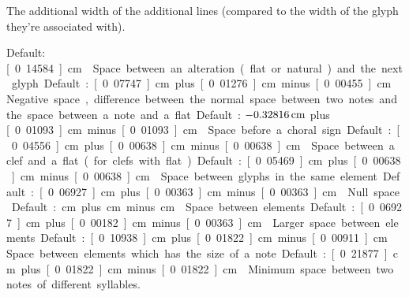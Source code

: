 The additional width of the additional lines (compared to the width of the glyph they're associated with).  

Default: \unit[0.14584]{cm}

Space between an alteration (flat or natural) and the next glyph. 

Default: \unit[0.07747]{cm} plus \unit[0.01276]{cm} minus \unit[0.00455]{cm}

Negative space, difference between the normal space between two notes and the space between a note and a flat.  

Default: $\unit[-0.32816]{cm}$ plus \unit[0.01093]{cm} minus \unit[0.01093]{cm}

Space before a choral sign. 

Default: \unit[0.04556]{cm} plus \unit[0.00638]{cm} minus \unit[0.00638]{cm}

Space between a clef and a flat (for clefs with flat).  

Default: \unit[0.05469]{cm} plus \unit[0.00638]{cm} minus \unit[0.00638]{cm}

Space between glyphs in the same element. 

Default: \unit[0.06927]{cm} plus \unit[0.00363]{cm} minus \unit[0.00363]{cm}

Null space.  

Default: \unit[0]{cm} plus \unit[0]{cm} minus \unit[0]{cm}

Space between elements.  

Default: \unit[0.06927]{cm} plus \unit[0.00182]{cm} minus \unit[0.00363]{cm}

Larger space between elements.  

Default: \unit[0.10938]{cm} plus \unit[0.01822]{cm} minus \unit[0.00911]{cm}

Space between elements which has the size of a note.  

Default: \unit[0.21877]{cm} plus \unit[0.01822]{cm} minus \unit[0.01822]{cm}

Minimum space between two notes of different syllables.  

